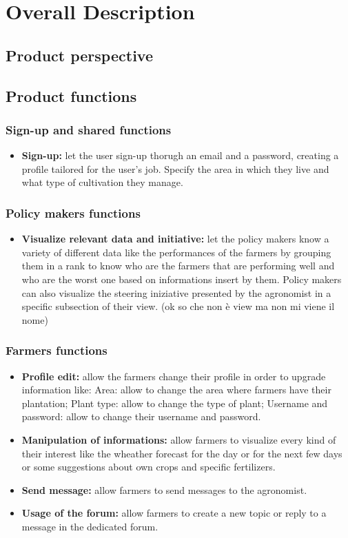 \documentclass[table, 12pt]{article}
\begin{document}
\section{Overall Description}
\subsection{Product perspective}
\subsection{Product functions}
\subsubsection{Sign-up and shared functions}
\begin{itemize}
    \item \textbf{Sign-up: }let the user sign-up thorugh an email and a password, creating a profile tailored for the user's job. Specify the area in which they live and what type of cultivation they manage.
\end{itemize}
\subsubsection{Policy makers functions}
\begin{itemize}                                 
    \item \textbf{Visualize relevant data and initiative: }let the policy makers know a variety of different data like the performances of the farmers by grouping them in a rank to know who are the farmers that are performing well and who are the worst one based on informations insert by them.
    Policy makers can also visualize the steering iniziative presented by the agronomist in a specific subsection of their view. (ok so che non è view ma non mi viene il nome)
\end{itemize}
\subsubsection{Farmers functions}
\begin{itemize}
    \item \textbf{Profile edit: }allow the farmers change their profile in order to upgrade information like: 
    \subitem Area: allow to change the area where farmers have their plantation;
    \subitem Plant type: allow to change the type of plant;
    \subitem Username and password: allow to change their username and password.

    \item \textbf{Manipulation of informations: }allow farmers to visualize every kind of their interest like the wheather forecast for the day or for the next few days or some suggestions about own crops and specific fertilizers.
    \item \textbf{Send message: }allow farmers to send messages to the agronomist.
    \item \textbf{Usage of the forum: }allow farmers to create a new topic or reply to a message in the dedicated forum.
\end{itemize}
\end{document}
